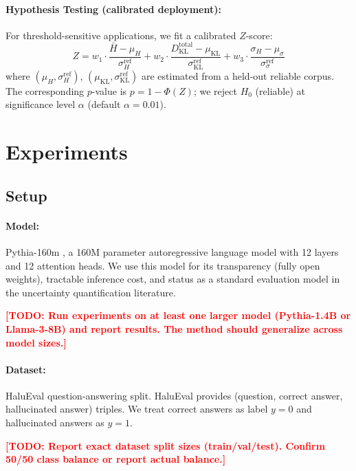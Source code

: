\documentclass[11pt]{article}
\newcommand{\TODO}[1]{\textcolor{red}{\textbf{[TODO: #1]}}}
\begin{document}
\paragraph{Hypothesis Testing (calibrated deployment):}
For threshold-sensitive applications, we fit a calibrated $Z$-score:
\[
  Z = w_1 \cdot \frac{\bar{H} - \mu_H}{\sigma_H^{\text{ref}}} 
    + w_2 \cdot \frac{D_{\text{KL}}^{\text{total}} - \mu_{\text{KL}}}{\sigma_{\text{KL}}^{\text{ref}}}
    + w_3 \cdot \frac{\sigma_H - \mu_{\sigma}}{\sigma_{\sigma}^{\text{ref}}}
\]
where $(\mu_H, \sigma_H^{\text{ref}})$, $(\mu_{\text{KL}}, \sigma_{\text{KL}}^{\text{ref}})$ 
are estimated from a held-out reliable corpus. 
The corresponding $p$-value is $p = 1 - \Phi(Z)$; we reject 
$H_0$ (reliable) at significance level $\alpha$ (default $\alpha = 0.01$).

\section{Experiments}

\subsection{Setup}

\paragraph{Model:} Pythia-160m \citep{biderman2023pythia}, a 160M parameter 
autoregressive language model with 12 layers and 12 attention heads.
We use this model for its transparency (fully open weights), tractable 
inference cost, and status as a standard evaluation model in the 
uncertainty quantification literature.

\TODO{Run experiments on at least one larger model (Pythia-1.4B or Llama-3-8B) 
and report results. The method should generalize across model sizes.}

\paragraph{Dataset:} HaluEval \citep{li2023halueval} question-answering split.
HaluEval provides (question, correct answer, hallucinated answer) triples.
We treat correct answers as label $y=0$ and hallucinated answers as $y=1$.

\TODO{Report exact dataset split sizes (train/val/test). 
Confirm 50/50 class balance or report actual balance.}
\end{document}
